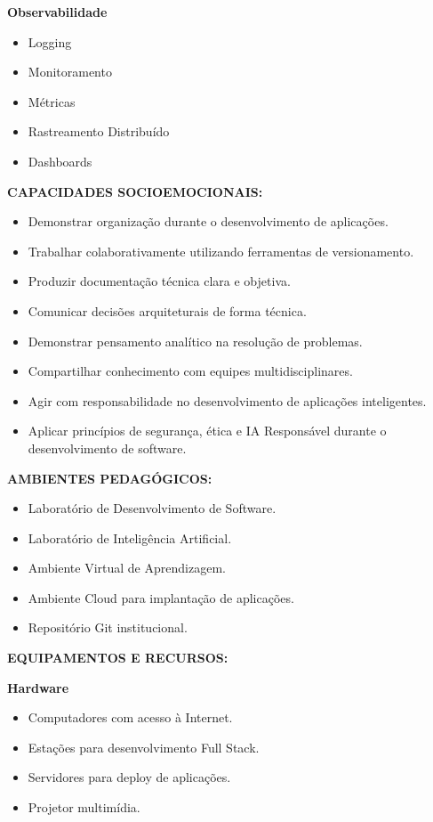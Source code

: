 \textbf{Observabilidade}

\begin{itemize}
\item Logging
\item Monitoramento
\item Métricas
\item Rastreamento Distribuído
\item Dashboards
\end{itemize}

\textbf{CAPACIDADES SOCIOEMOCIONAIS:}

\begin{itemize}
\item Demonstrar organização durante o desenvolvimento de aplicações.
\item Trabalhar colaborativamente utilizando ferramentas de versionamento.
\item Produzir documentação técnica clara e objetiva.
\item Comunicar decisões arquiteturais de forma técnica.
\item Demonstrar pensamento analítico na resolução de problemas.
\item Compartilhar conhecimento com equipes multidisciplinares.
\item Agir com responsabilidade no desenvolvimento de aplicações inteligentes.
\item Aplicar princípios de segurança, ética e IA Responsável durante o desenvolvimento de software.
\end{itemize}

\textbf{AMBIENTES PEDAGÓGICOS:}

\begin{itemize}
\item Laboratório de Desenvolvimento de Software.
\item Laboratório de Inteligência Artificial.
\item Ambiente Virtual de Aprendizagem.
\item Ambiente Cloud para implantação de aplicações.
\item Repositório Git institucional.
\end{itemize}

\textbf{EQUIPAMENTOS E RECURSOS:}

\textbf{Hardware}

\begin{itemize}
\item Computadores com acesso à Internet.
\item Estações para desenvolvimento Full Stack.
\item Servidores para deploy de aplicações.
\item Projetor multimídia.
\end{itemize}

